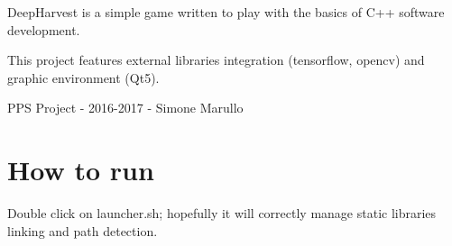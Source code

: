 Deep\+Harvest is a simple game written to play with the basics of C++ software development.

This project features external libraries integration (tensorflow, opencv) and graphic environment (Qt5).

P\+PS Project -\/ 2016-\/2017 -\/ Simone Marullo\hypertarget{index_howto}{}\section{How to run}\label{index_howto}
Double click on launcher.\+sh; hopefully it will correctly manage static libraries linking and path detection. 
